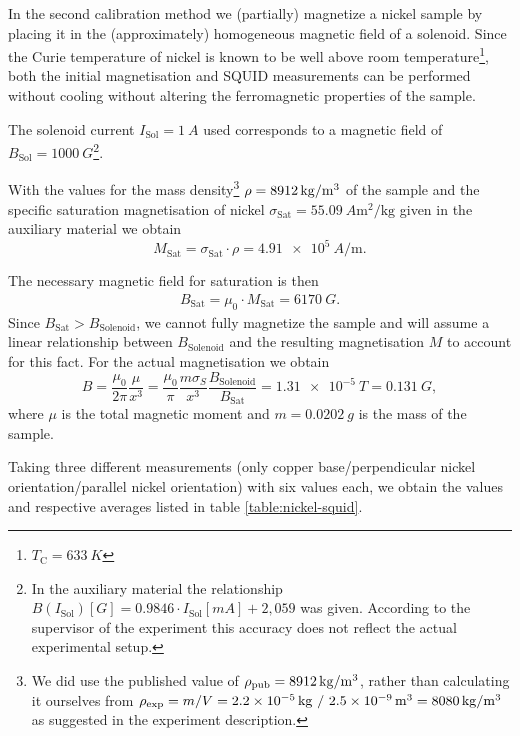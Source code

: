 \documentclass[paper=a4, fontsize=10pt]{scrartcl}
\begin{document}
In the second calibration method we (partially) magnetize a nickel
sample by placing it in the (approximately) homogeneous magnetic field
of a solenoid. Since the Curie temperature of nickel is known to be
well above room temperature\footnote{$T_{\mathrm{C}} = \SI{633}{K}$},
both the initial magnetisation and SQUID measurements can be performed
without cooling without altering the ferromagnetic properties of the
sample.

The solenoid current $I_{\mathrm{Sol}} = \SI{1}{A}$ used corresponds
to a magnetic field of $B_{\mathrm{Sol}} = \SI{1000}{G}$\footnote{In
  the auxiliary material the relationship
  $B(I_{\mathrm{Sol}}) [\si{G}] = 0.9846 \cdot I_{\mathrm{Sol}}
  [\si{mA}] + 2,059$ was given. According to the supervisor of the
  experiment this accuracy does not reflect the actual experimental
  setup.}.


With the values for the mass density\footnote{We did use the published
  value of $\rho_{\mathrm{pub}} = \SI{8912}{\kg\per\cubic m}$, rather
  than calculating it ourselves from
  $\rho_{\mathrm{exp}} = m/V = \SI{2.2e-5}{\kg} ~/~ \SI{2.5e-9}{\cubic
    m} = \SI{8080}{\kg\per\cubic m}$ as suggested in the experiment
  description.} $\rho = \SI{8912}{\kg\per\cubic m}$ of the sample and
the specific saturation magnetisation of nickel
$\sigma_{\mathrm{Sat}} = \SI{55.09}{A\square\m\per\kg}$ given in the
auxiliary material we obtain
\[ M_{\mathrm{Sat}} = \sigma_{\mathrm{Sat}} \cdot \rho =
  \SI{4.91e5}{A\per\m}. \]

The necessary magnetic field for saturation is then
\begin{align*}
  B_{\mathrm{Sat}} = \mu_0 \cdot M_{\mathrm{Sat}} = \SI{6170}{G}.
\end{align*}
Since $B_{\mathrm{Sat}} > B_{\mathrm{Solenoid}}$, we cannot fully
magnetize the sample and will assume a linear relationship between
$B_{\mathrm{Solenoid}}$ and the resulting magnetisation $M$ to account
for this fact. For the actual magnetisation we obtain
\[ B = \dfrac{\mu_0}{2\pi} \dfrac{\mu}{x^3} = \dfrac{\mu_0}{\pi}
  \dfrac{m\sigma_S}{x^3}\dfrac{B_{\mathrm{Solenoid}}}{B_{\mathrm{Sat}}}
  = \SI{1.31e-5}{T} = \SI{0.131}{G}, \] where $\mu$ is the total
magnetic moment and $m = \SI{0.0202}{g}$ is the mass of the sample.

Taking three different measurements (only copper base/perpendicular
nickel orientation/parallel nickel orientation) with six values each,
we obtain the values and respective averages listed in table
\ref{table:nickel-squid}.
\end{document}

